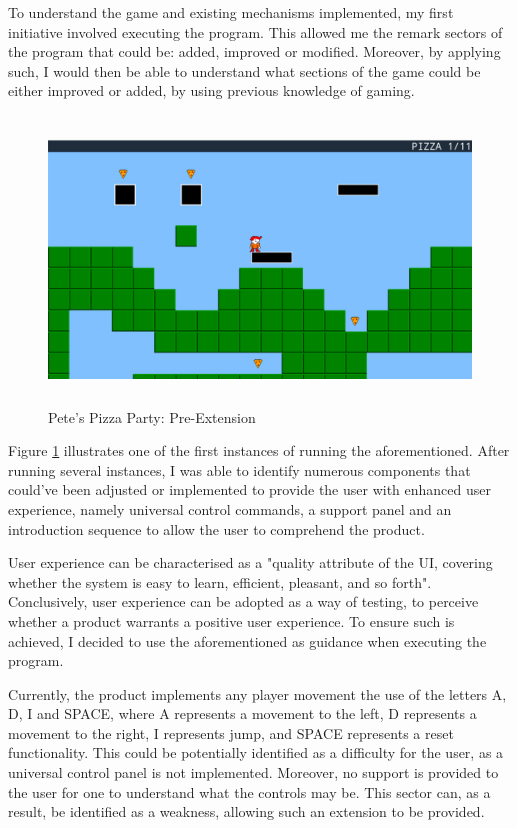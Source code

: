 \documentclass{article}
\begin{document}
To understand the game and existing mechanisms implemented, my first initiative involved executing the program. This allowed me the remark sectors of the program that could be: added, improved or modified. Moreover, by applying such, I would then be able to understand what sections of the game could be either improved or added, by using previous knowledge of gaming.
\begin{figure}[H]
    \centering
    \includegraphics[height=3in]{figure1.png}
    \caption[Pete's Pizza Party: Pre-Extension]{Pete's Pizza Party: Pre-Extension}
    \label{fig:pete's pizza party}
\end{figure}
Figure \ref{fig:pete's pizza party} illustrates one of the first instances of running the aforementioned.
After running several instances, I was able to identify numerous components that could've been adjusted or implemented to provide the user with enhanced user experience, namely universal control commands, a support panel and an introduction sequence to allow the user to comprehend the product.

User experience can be characterised as a "quality attribute of the UI, covering whether the system is easy to learn, efficient, pleasant, and so forth". \cite{userexperience} Conclusively, user experience can be adopted as a way of testing, to perceive whether a product warrants a positive user experience. To ensure such is achieved, I decided to use the aforementioned as guidance when executing the program.

Currently, the product implements any player movement the use of the letters A, D, I and SPACE, where A represents a movement to the left, D represents a movement to the right, I represents jump, and SPACE represents a reset functionality. This could be potentially identified as a difficulty for the user, as a universal control panel is not implemented. Moreover, no support is provided to the user for one to understand what the controls may be. This sector can, as a result, be identified as a weakness, allowing such an extension to be provided.
\end{document}
